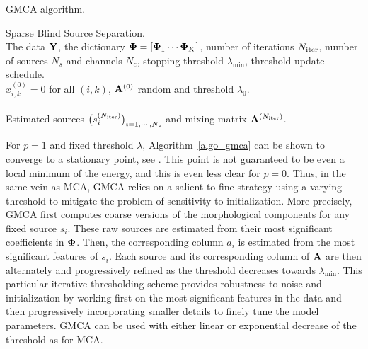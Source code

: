 {\linespread{1}
\begin{algorithm}[htb]
\caption{GMCA algorithm.}
\label{algo_gmca}
 Sparse Blind Source Separation.\\
 The data $\mathbf{Y}$, the dictionary ${\bf\Phi}=[{\bf\Phi}_1 \cdots {\bf\Phi}_K]$, number of iterations $N_\mathrm{iter}$, number of sources $N_s$ and channels $N_c$, stopping threshold $\lambda_{\min}$, threshold update schedule.\\
 $x_{i,k}^{(0)} = 0$ for all $(i,k)$, ${\mathbf{A}}^{(0)}$ random and threshold $\lambda_0$.\\
 \\
 Estimated sources $\big(s^{(N_\mathrm{iter})}_i\big)_{i=1,\cdots,N_s}$ and mixing matrix ${{\mathbf{A}}}^{(N_\mathrm{iter})}$.
\end{algorithm}}

For $p=1$ and fixed threshold $\lambda$, Algorithm~\ref{algo_gmca} can be shown to converge to a stationary point, see \citep{Tseng01,bobin-gmca-cmb}. 
This point is not guaranteed to be even a local minimum of the energy, and this is even less clear for $p=0$. Thus, in the same vein as MCA, GMCA relies 
on a salient-to-fine strategy using a varying threshold to mitigate the problem of sensitivity to initialization. More precisely, GMCA first computes 
coarse versions of the morphological components for any fixed source $s_i$. These raw sources are estimated from their most significant coefficients in ${\bf\Phi}$. 
Then, the corresponding column $a_i$ is estimated from the most significant features of $s_i$. Each source and its corresponding column of ${\mathbf{A}}$ are then 
alternately and progressively refined as the threshold decreases towards $\lambda_{\min}$. This particular iterative thresholding scheme provides robustness 
to noise and initialization by working first on the most significant features in the data and then progressively incorporating smaller details to finely 
tune the model parameters. GMCA can be used with either linear or exponential decrease of the threshold as for MCA.

